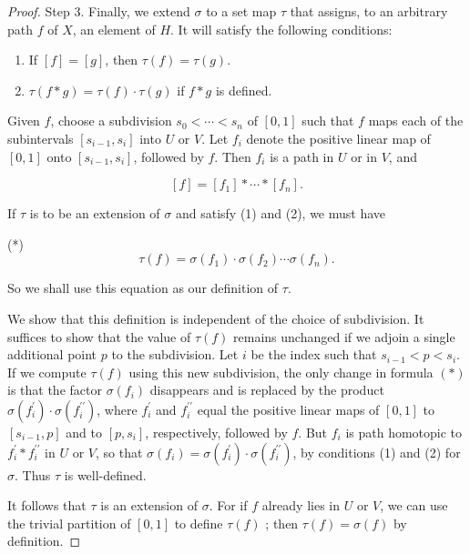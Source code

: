 \begin{proof}
Step 3. Finally, we extend \(\sigma\) to a set map \(\tau\) that assigns, to an arbitrary path \(f\) of \(X\), an element of \(H\). It will satisfy the following conditions:

\begin{enumerate}[itemsep=0.2em, parsep=0pt, topsep=0pt, partopsep=0pt, leftmargin=*, label=(\arabic*), align=left]
\item If \([ f] = [ g]\), then \(\tau ( f) = \tau ( g)\).
\item \(\tau ( {f * g}) = \tau ( f) \cdot \tau ( g)\) if \(f * g\) is defined.
\end{enumerate}

Given \(f\), choose a subdivision \(s_{0} < \cdots < s_{n}\) of \([ {0,1}]\) such that \(f\) maps each of the subintervals \([ {s_{i - 1},s_{i}}]\) into \(U\) or \(V\). Let \(f_{i}\) denote the positive linear map of \([ {0,1}]\) onto \([ {s_{i - 1},s_{i}}]\), followed by \(f\). Then \(f_{i}\) is a path in \(U\) or in \(V\), and

\[
[ f] = [ f_{1}] * \cdots * [ f_{n}] .
\]

If \(\tau\) is to be an extension of \(\sigma\) and satisfy (1) and (2), we must have

(*)
\[
\tau ( f) = \sigma ( f_{1}) \cdot \sigma ( f_{2}) \cdots \sigma ( f_{n}).
\]

So we shall use this equation as our definition of \(\tau\).

We show that this definition is independent of the choice of subdivision. It suffices to show that the value of \(\tau ( f)\) remains unchanged if we adjoin a single additional point \(p\) to the subdivision. Let \(i\) be the index such that \(s_{i - 1} < p < s_{i}\). If we compute \(\tau ( f)\) using this new subdivision, the only change in formula \(( *)\) is that the factor \(\sigma ( f_{i})\) disappears and is replaced by the product \(\sigma ( f_i^{\prime }) \cdot \sigma ( f_i^{\prime \prime })\), where \(f_i^{\prime }\) and \(f_i^{\prime \prime }\) equal the positive linear maps of \([ {0,1}]\) to \([ {s_{i - 1},p}]\) and to \([ {p,s_{i}}]\), respectively, followed by \(f\). But \(f_{i}\) is path homotopic to \(f_i^{\prime } * f_i^{\prime \prime }\) in \(U\) or \(V\), so that \(\sigma ( f_{i}) = \sigma ( f_i^{\prime }) \cdot \sigma ( f_i^{\prime \prime })\), by conditions (1) and (2) for \(\sigma\). Thus \(\tau\) is well-defined.

It follows that \(\tau\) is an extension of \(\sigma\). For if \(f\) already lies in \(U\) or \(V\), we can use the trivial partition of \([ {0,1}]\) to define \(\tau ( f)\) ; then \(\tau ( f) = \sigma ( f)\) by definition.


\end{proof}
